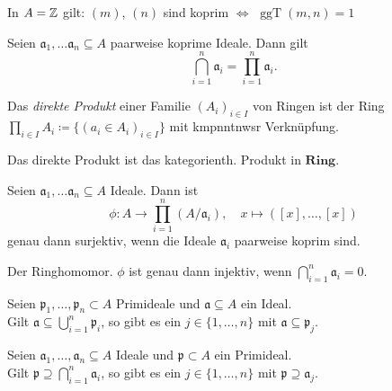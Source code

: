\documentclass{cheat-sheet}
\DeclareMathOperator{\ggT}{ggT} %
\newcommand{\Ring}{\mathbf{Ring}} %
\newcommand{\aaa}{\mathfrak{a}}
\newcommand{\ppp}{\mathfrak{p}}
\begin{document}
\begin{bsp}
  In $A = \mathbb{Z}$ gilt: \enspace
  $(m)$, $(n)$ sind koprim $\iff$ $\ggT(m, n) = 1$
\end{bsp}

\begin{prop}
  Seien $\aaa_1, \ldots \aaa_n \subseteq A$ paarweise koprime Ideale.
  Dann gilt
  \[
    \bigcap_{i=1}^n \aaa_i = \prod_{i=1}^n \aaa_i.
  \]
\end{prop}


\begin{defn}
  Das \emph{direkte Produkt} einer Familie $(A_i)_{i \in I}$ von Ringen ist der Ring $\prod_{i \in I} A_i \coloneqq \{ (a_i \in A_i)_{i \in I} \}$ mit kmpnntnwsr Verknüpfung.
\end{defn}

\begin{bem}
  Das direkte Produkt ist das kategorienth. Produkt in $\Ring$.
\end{bem}

\begin{prop}
  Seien $\aaa_1, \ldots \aaa_n \subseteq A$ Ideale.
  Dann ist
  \[
    \phi : A \to \prod_{i=1}^n (A/\aaa_i), \quad x \mapsto ([x], \ldots, [x])
  \]
  genau dann surjektiv, wenn die Ideale $\aaa_i$ paarweise koprim sind.
\end{prop}

\begin{bem}
  Der Ringhomomor. $\phi$ ist genau dann injektiv, wenn $\bigcap_{i=1}^n \aaa_i = 0$.
\end{bem}


\begin{prop}
  Seien $\ppp_1, \ldots, \ppp_n \subset A$ Primideale und $\aaa \subseteq A$ ein Ideal. \\
  Gilt $\aaa \subseteq \bigcup_{i=1}^n \ppp_i$, so gibt es ein $j \in \{ 1, \ldots, n \}$ mit $\aaa \subseteq \ppp_j$.
\end{prop}

\begin{prop}
  Seien $\aaa_1, \ldots, \aaa_n \subseteq A$ Ideale und $\ppp \subset A$ ein Primideal. \\
  Gilt $\ppp \supseteq \bigcap_{i=1}^n \aaa_i$, so gibt es ein $j \in \{ 1, \ldots, n \}$ mit $\ppp \supseteq \aaa_j$.
\end{prop}
\end{document}
